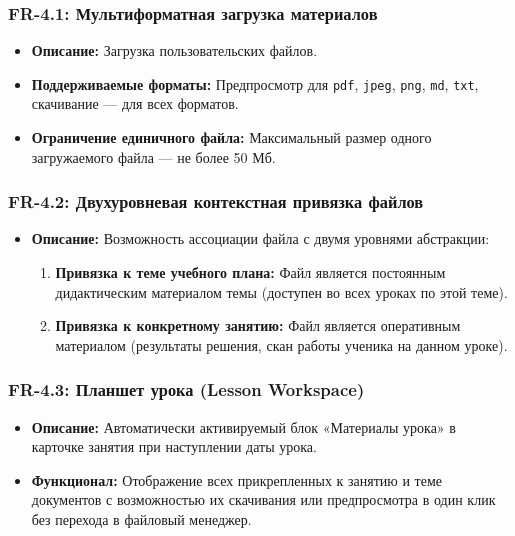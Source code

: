 \documentclass[12pt,a4paper]{article}
\begin{document}
\subsubsection*{FR-4.1: Мультиформатная загрузка материалов}
\begin{itemize}
    \item \textbf{Описание:} Загрузка пользовательских файлов.
    \item \textbf{Поддерживаемые форматы:} Предпросмотр для \texttt{pdf}, \texttt{jpeg}, \texttt{png}, \texttt{md}, \texttt{txt}, скачивание --- для всех форматов.
    \item \textbf{Ограничение единичного файла:} Максимальный размер одного загружаемого файла — не более 50 Мб.
\end{itemize}

\subsubsection*{FR-4.2: Двухуровневая контекстная привязка файлов}
\begin{itemize}
    \item \textbf{Описание:} Возможность ассоциации файла с двумя уровнями абстракции:
          \begin{enumerate}
              \item \textbf{Привязка к теме учебного плана:} Файл является постоянным дидактическим материалом темы (доступен во всех уроках по этой теме).
              \item \textbf{Привязка к конкретному занятию:} Файл является оперативным материалом (результаты решения, скан работы ученика на данном уроке).
          \end{enumerate}
\end{itemize}

\subsubsection*{FR-4.3: Планшет урока (Lesson Workspace)}
\begin{itemize}
    \item \textbf{Описание:} Автоматически активируемый блок «Материалы урока» в карточке занятия при наступлении даты урока.
    \item \textbf{Функционал:} Отображение всех прикрепленных к занятию и теме документов с возможностью их скачивания или предпросмотра в один клик без перехода в файловый менеджер.
\end{itemize}
\end{document}
